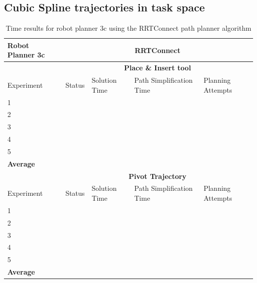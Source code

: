 \subsection{Cubic Spline trajectories in task space}

\begin{table}[H]
\centering
\begin{tabular}{|p{2cm}|c|p{3cm}|p{3cm}|p{3cm}|}
\hline
Robot Planner 3c           & \multicolumn{4}{c}{\textbf{RRTConnect}}                                                                                                 \vline \\
\hline
                          & \multicolumn{4}{c}{\textbf{Place \& Insert tool}}                     \vline \\
\hline
Experiment                & Status & Solution Time & Path Simplification Time & Planning Attempts  \\
\hline
1                         &        &               &                          &  \\
2                         &        &               &                          &  \\
3                         &        &               &                          &  \\
4                         &        &               &                          &  \\
5                         &        &               &                          &  \\
\hline
\textbf{Average} & 	& 	& 	&  \\
\hline
                          & \multicolumn{4}{c}{\textbf{Pivot Trajectory}}                     \vline \\
\hline
Experiment                & Status & Solution Time & Path Simplification Time & Planning Attempts  \\
\hline
1                         &        &               &                          &  \\
2                         &        &               &                          &  \\
3                         &        &               &                          &  \\
4                         &        &               &                          &  \\
5                         &        &               &                          &  \\
\hline
\textbf{Average} & 	& 	& 	&  \\
\hline
\end{tabular}
\caption{Time results for robot planner 3c using the RRTConnect path planner algorithm}
\label{robot-planner3c-rrtconnect-data}
\end{table}


